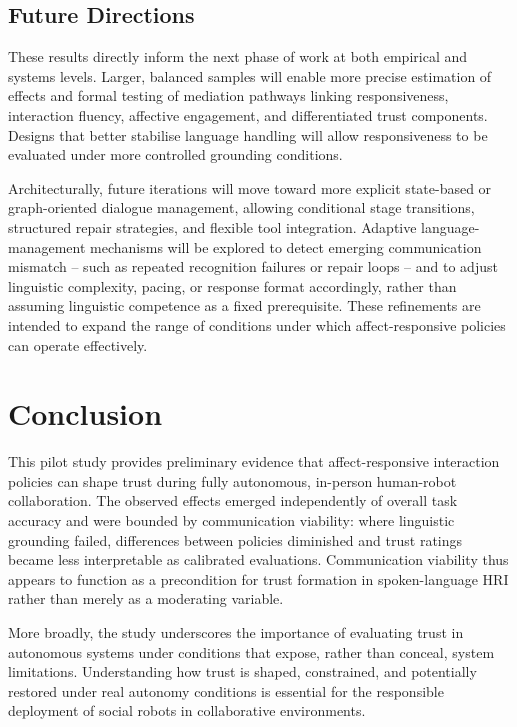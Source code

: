 \documentclass[
  authoryear,
  doubleblind,
  3p]{elsarticle}
\begin{document}
\subsection{Future Directions}\label{future-directions}

These results directly inform the next phase of work at both empirical
and systems levels. Larger, balanced samples will enable more precise
estimation of effects and formal testing of mediation pathways linking
responsiveness, interaction fluency, affective engagement, and
differentiated trust components. Designs that better stabilise language
handling will allow responsiveness to be evaluated under more controlled
grounding conditions.

Architecturally, future iterations will move toward more explicit
state-based or graph-oriented dialogue management, allowing conditional
stage transitions, structured repair strategies, and flexible tool
integration. Adaptive language-management mechanisms will be explored to
detect emerging communication mismatch -- such as repeated recognition
failures or repair loops -- and to adjust linguistic complexity, pacing,
or response format accordingly, rather than assuming linguistic
competence as a fixed prerequisite. These refinements are intended to
expand the range of conditions under which affect-responsive policies
can operate effectively.

\section{Conclusion}\label{conclusion}

This pilot study provides preliminary evidence that affect-responsive
interaction policies can shape trust during fully autonomous, in-person
human-robot collaboration. The observed effects emerged independently of
overall task accuracy and were bounded by communication viability: where
linguistic grounding failed, differences between policies diminished and
trust ratings became less interpretable as calibrated evaluations.
Communication viability thus appears to function as a precondition for
trust formation in spoken-language HRI rather than merely as a
moderating variable.

More broadly, the study underscores the importance of evaluating trust
in autonomous systems under conditions that expose, rather than conceal,
system limitations. Understanding how trust is shaped, constrained, and
potentially restored under real autonomy conditions is essential for the
responsible deployment of social robots in collaborative environments.
\end{document}
